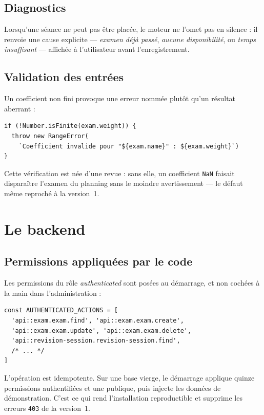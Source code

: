 \documentclass[11pt,a4paper]{report}
\begin{document}
\section{Diagnostics}

Lorsqu'une séance ne peut pas être placée, le moteur ne l'omet pas en silence : il
renvoie une cause explicite --- \emph{examen déjà passé}, \emph{aucune
disponibilité}, ou \emph{temps insuffisant} --- affichée à l'utilisateur avant
l'enregistrement.

\section{Validation des entrées}

Un coefficient non fini provoque une erreur nommée plutôt qu'un résultat aberrant :

\begin{lstlisting}[style=ts]
if (!Number.isFinite(exam.weight)) {
  throw new RangeError(
    `Coefficient invalide pour "${exam.name}" : ${exam.weight}`)
}
\end{lstlisting}

Cette vérification est née d'une revue : sans elle, un coefficient \texttt{NaN}
faisait disparaître l'examen du planning sans le moindre avertissement --- le
défaut même reproché à la version~1.

\chapter{Le backend}

\section{Permissions appliquées par le code}

Les permissions du rôle \emph{authenticated} sont posées au démarrage, et non
cochées à la main dans l'administration :

\begin{lstlisting}[style=ts,caption={\texttt{src/bootstrap/permissions.ts}, extrait}]
const AUTHENTICATED_ACTIONS = [
  'api::exam.exam.find', 'api::exam.exam.create',
  'api::exam.exam.update', 'api::exam.exam.delete',
  'api::revision-session.revision-session.find',
  /* ... */
]
\end{lstlisting}

L'opération est idempotente. Sur une base vierge, le démarrage applique quinze
permissions authentifiées et une publique, puis injecte les données de
démonstration. C'est ce qui rend l'installation reproductible et supprime les
erreurs \texttt{403} de la version~1.
\end{document}
